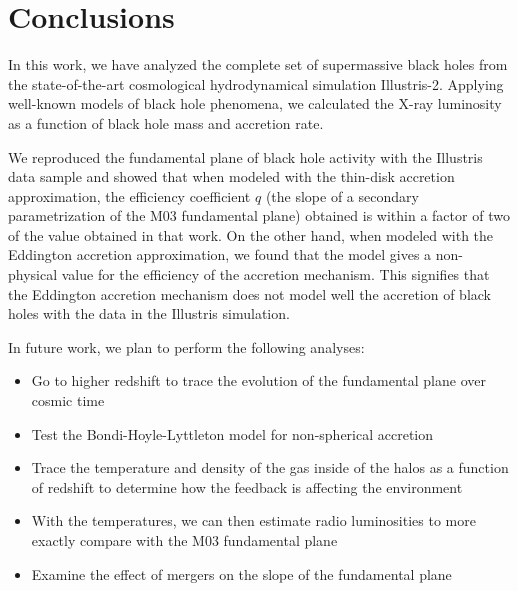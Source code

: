 \section{Conclusions}

\label{sec:conclusions}

In this work, we have analyzed the complete set
of supermassive black holes from the state-of-the-art cosmological
hydrodynamical simulation Illustris-2. Applying well-known models
of black hole phenomena, we calculated the X-ray luminosity 
as a function of black hole mass and accretion rate. 

We reproduced the fundamental plane of black hole activity with the
Illustris data sample and showed that when modeled with the thin-disk
accretion approximation, the efficiency coefficient $q$ (the slope of
a secondary parametrization of the M03 fundamental plane) obtained is within
a factor of two of the value obtained in that work. On the other hand, when modeled with the Eddington
accretion approximation, we found that the model gives a non-physical
value for the efficiency of the accretion mechanism. This signifies
that the Eddington accretion mechanism does not model well the accretion of
black holes with the data in the Illustris simulation.

In future work, we plan to perform the following analyses:
\begin{itemize}
\item Go to higher redshift to trace the evolution of the fundamental plane
over cosmic time
\item Test the Bondi-Hoyle-Lyttleton model for non-spherical accretion
\item Trace the temperature and density of the gas inside of the halos as
a function of redshift to determine how the feedback is affecting
the environment
\item With the temperatures, we can then estimate radio luminosities to
more exactly compare with the M03 fundamental plane
\item Examine the effect of mergers on the slope of the fundamental plane
\end{itemize}
